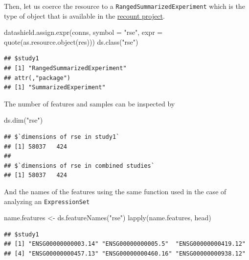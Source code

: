 \documentclass[
]{book}
\newenvironment{Shaded}{\begin{snugshade}}{\end{snugshade}}
\newcommand{\AttributeTok}[1]{\textcolor[rgb]{0.77,0.63,0.00}{#1}}
\newcommand{\FunctionTok}[1]{\textcolor[rgb]{0.00,0.00,0.00}{#1}}
\newcommand{\NormalTok}[1]{#1}
\newcommand{\OtherTok}[1]{\textcolor[rgb]{0.56,0.35,0.01}{#1}}
\newcommand{\StringTok}[1]{\textcolor[rgb]{0.31,0.60,0.02}{#1}}
\begin{document}
Then, let us coerce the resource to a \texttt{RangedSummarizedExperiment} which is the type of object that is available in the \href{https://jhubiostatistics.shinyapps.io/recount/}{recount project}.

\begin{Shaded}
\begin{Highlighting}[]
\FunctionTok{datashield.assign.expr}\NormalTok{(conns, }\AttributeTok{symbol =} \StringTok{"rse"}\NormalTok{, }
                       \AttributeTok{expr =} \FunctionTok{quote}\NormalTok{(}\FunctionTok{as.resource.object}\NormalTok{(res)))}
\FunctionTok{ds.class}\NormalTok{(}\StringTok{"rse"}\NormalTok{)}
\end{Highlighting}
\end{Shaded}

\begin{verbatim}
## $study1
## [1] "RangedSummarizedExperiment"
## attr(,"package")
## [1] "SummarizedExperiment"
\end{verbatim}

The number of features and samples can be inspected by

\begin{Shaded}
\begin{Highlighting}[]
\FunctionTok{ds.dim}\NormalTok{(}\StringTok{"rse"}\NormalTok{)}
\end{Highlighting}
\end{Shaded}

\begin{verbatim}
## $`dimensions of rse in study1`
## [1] 58037   424
## 
## $`dimensions of rse in combined studies`
## [1] 58037   424
\end{verbatim}

And the names of the features using the same function used in the case of analyzing an \texttt{ExpressionSet}

\begin{Shaded}
\begin{Highlighting}[]
\NormalTok{name.features }\OtherTok{\textless{}{-}} \FunctionTok{ds.featureNames}\NormalTok{(}\StringTok{"rse"}\NormalTok{)}
\FunctionTok{lapply}\NormalTok{(name.features, head)}
\end{Highlighting}
\end{Shaded}

\begin{verbatim}
## $study1
## [1] "ENSG00000000003.14" "ENSG00000000005.5"  "ENSG00000000419.12"
## [4] "ENSG00000000457.13" "ENSG00000000460.16" "ENSG00000000938.12"
\end{verbatim}
\end{document}
